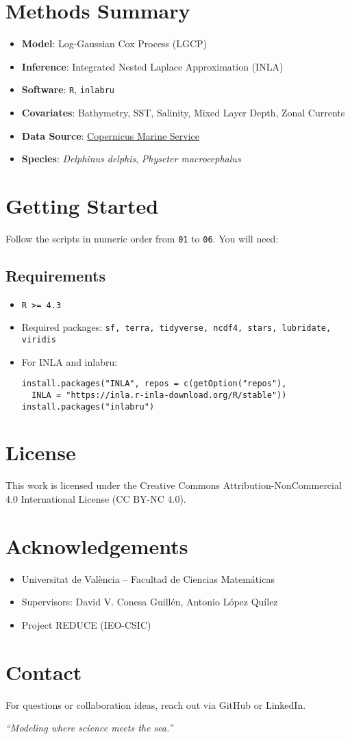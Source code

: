 \documentclass[12pt]{article}
\begin{document}
\section*{Methods Summary}
\begin{itemize}
  \item \textbf{Model}: Log-Gaussian Cox Process (LGCP)
  \item \textbf{Inference}: Integrated Nested Laplace Approximation (INLA)
  \item \textbf{Software}: \texttt{R}, \texttt{inlabru}
  \item \textbf{Covariates}: Bathymetry, SST, Salinity, Mixed Layer Depth, Zonal Currents
  \item \textbf{Data Source}: \href{https://marine.copernicus.eu/}{Copernicus Marine Service}
  \item \textbf{Species}: \textit{Delphinus delphis}, \textit{Physeter macrocephalus}
\end{itemize}

\section*{Getting Started}
Follow the scripts in numeric order from \texttt{01} to \texttt{06}. You will need:

\subsection*{Requirements}
\begin{itemize}
  \item \texttt{R >= 4.3}
  \item Required packages: \texttt{sf, terra, tidyverse, ncdf4, stars, lubridate, viridis}
  \item For INLA and inlabru:
\begin{verbatim}
install.packages("INLA", repos = c(getOption("repos"),
  INLA = "https://inla.r-inla-download.org/R/stable"))
install.packages("inlabru")
\end{verbatim}
\end{itemize}

\section*{License}
This work is licensed under the Creative Commons Attribution-NonCommercial 4.0 International License (CC BY-NC 4.0).

\section*{Acknowledgements}
\begin{itemize}
  \item Universitat de València – Facultad de Ciencias Matemáticas
  \item Supervisors: David V. Conesa Guillén, Antonio López Quílez
  \item Project REDUCE (IEO-CSIC)
\end{itemize}

\section*{Contact}
For questions or collaboration ideas, reach out via GitHub or LinkedIn.

\bigskip

\textit{“Modeling where science meets the sea.”} 🌊
\end{document}
